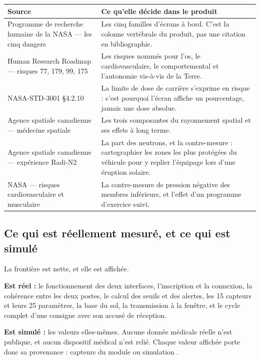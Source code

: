 \documentclass[11pt,a4paper]{article}
\begin{document}
\begin{tabularx}{\textwidth}{@{}L{4.6cm} X@{}}
\toprule
\textbf{Source} & \textbf{Ce qu'elle d\'ecide dans le produit} \\
\midrule
Programme de recherche humaine de la NASA --- les cinq dangers & Les cinq familles d'\'ecrans \`a bord. C'est la colonne vert\'ebrale du produit, pas une citation en bibliographie. \\
Human Research Roadmap --- risques 77, 179, 99, 175 & Les risques nomm\'es pour l'os, le cardiovasculaire, le comportemental et l'autonomie vis-\`a-vis de la Terre. \\
NASA-STD-3001 \S4.2.10 & La limite de dose de carri\`ere s'exprime en risque : c'est pourquoi l'\'ecran affiche un pourcentage, jamais une dose absolue. \\
Agence spatiale canadienne --- m\'edecine spatiale & Les trois composantes du rayonnement spatial et ses effets \`a long terme. \\
Agence spatiale canadienne --- exp\'erience Radi-N2 & La part des neutrons, et la contre-mesure : cartographier les zones les plus prot\'eg\'ees du v\'ehicule pour y replier l'\'equipage lors d'une \'eruption solaire. \\
NASA --- risques cardiovasculaire et musculaire & La contre-mesure de pression n\'egative des membres inf\'erieurs, et l'effet d'un programme d'exercice suivi. \\
\bottomrule
\end{tabularx}

\subsection{Ce qui est r\'eellement mesur\'e, et ce qui est simul\'e}

La fronti\`ere est nette, et elle est affich\'ee.

\textbf{Est r\'eel :} le fonctionnement des deux interfaces, l'inscription et la connexion, la
coh\'erence entre les deux postes, le calcul des seuils et des alertes, les 15 capteurs et leurs 25
param\`etres, la base du sol, la transmission \`a la fen\^etre, et le cycle complet d'une consigne
avec son accus\'e de r\'eception.

\textbf{Est simul\'e :} les valeurs elles-m\^emes. Aucune donn\'ee m\'edicale r\'eelle n'est publique,
et aucun dispositif m\'edical n'est reli\'e. Chaque valeur affich\'ee porte donc sa provenance :
\og capteurs du module \fg{} ou \og simulation \fg{}.
\end{document}
